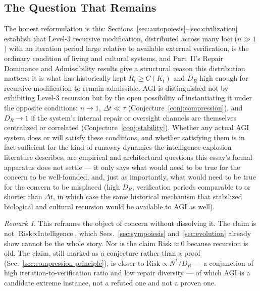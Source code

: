 \documentclass[12pt,a4paper]{article}
\theoremstyle{plain}
\theoremstyle{definition}
\theoremstyle{remark}
\newtheorem{remark}[theorem]{Remark}
\newcommand{\DR}{D_R}
\begin{document}
\subsection{The Question That Remains}
\label{subsec:remaining-question}

The honest reformulation is this: Sections~\ref{sec:autopoiesis}--\ref{sec:civilization} establish that Level-3 recursive modification, distributed across many loci ($n\gg1$) with an iteration period large relative to available external verification, is the ordinary condition of living and cultural systems, and Part~II's Repair Dominance and Admissibility results give a structural reason this distribution matters: it is what has historically kept $R_t \ge C(K_t)$ and $\DR$ high enough for recursive modification to remain admissible. AGI is distinguished not by exhibiting Level-3 recursion but by the open possibility of instantiating it under the opposite conditions: $n \to 1$, $\Delta t \ll \tau$ (Conjecture~\ref{conj:compression}), and $\DR \to 1$ if the system's internal repair or oversight channels are themselves centralized or correlated (Conjecture~\ref{conj:stability}). Whether any actual AGI system does or will satisfy these conditions, and whether satisfying them is in fact sufficient for the kind of runaway dynamics the intelligence-explosion literature describes, are empirical and architectural questions this essay's formal apparatus does not settle — it only says what would need to be true for the concern to be well-founded, and, just as importantly, what would need to be true for the concern to be misplaced (high $\DR$, verification periods comparable to or shorter than $\Delta t$, in which case the same historical mechanism that stabilized biological and cultural recursion would be available to AGI as well).

\begin{remark}
This reframes the object of concern without dissolving it. The claim is not $\text{Risk} \propto \text{Intelligence}$, which Secs.~\ref{sec:sympoiesis} and~\ref{sec:evolution} already show cannot be the whole story. Nor is the claim $\text{Risk} \approx 0$ because recursion is old. The claim, still marked as a conjecture rather than a proof (Sec.~\ref{sec:compression-principle}), is closer to $\text{Risk} \propto N^\ast / \DR$ — a conjunction of high iteration-to-verification ratio and low repair diversity — of which AGI is a candidate extreme instance, not a refuted one and not a proven one.
\end{remark}
\end{document}
